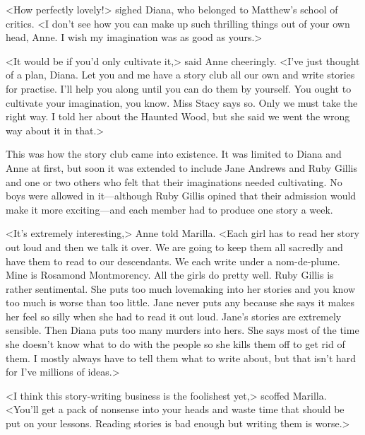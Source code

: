 <How perfectly lovely!> sighed Diana, who belonged to Matthew's school of critics. <I don't see how you can make up such thrilling things out of your own head, Anne. I wish my imagination was as good as yours.>

<It would be if you'd only cultivate it,> said Anne cheeringly. <I've just thought of a plan, Diana. Let you and me have a story club all our own and write stories for practise. I'll help you along until you can do them by yourself. You ought to cultivate your imagination, you know. Miss Stacy says so. Only we must take the right way. I told her about the Haunted Wood, but she said we went the wrong way about it in that.>

This was how the story club came into existence. It was limited to Diana and Anne at first, but soon it was extended to include Jane Andrews and Ruby Gillis and one or two others who felt that their imaginations needed cultivating. No boys were allowed in it—although Ruby Gillis opined that their admission would make it more exciting—and each member had to produce one story a week.

<It's extremely interesting,> Anne told Marilla. <Each girl has to read her story out loud and then we talk it over. We are going to keep them all sacredly and have them to read to our descendants. We each write under a nom-de-plume. Mine is Rosamond Montmorency. All the girls do pretty well. Ruby Gillis is rather sentimental. She puts too much lovemaking into her stories and you know too much is worse than too little. Jane never puts any because she says it makes her feel so silly when she had to read it out loud. Jane's stories are extremely sensible. Then Diana puts too many murders into hers. She says most of the time she doesn't know what to do with the people so she kills them off to get rid of them. I mostly always have to tell them what to write about, but that isn't hard for I've millions of ideas.>

<I think this story-writing business is the foolishest yet,> scoffed Marilla. <You'll get a pack of nonsense into your heads and waste time that should be put on your lessons. Reading stories is bad enough but writing them is worse.>

